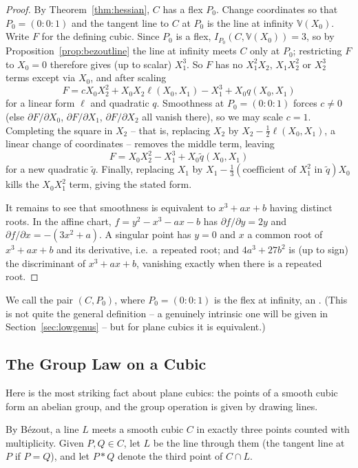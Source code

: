 \documentclass[a4paper]{scrartcl}
\newcommand{\V}{\mathbb{V}}
\begin{document}
\begin{proof}
	By Theorem~\ref{thm:hessian}, $C$ has a flex $P_0$. Change coordinates so that $P_0 = (0:0:1)$ and the tangent line to $C$ at $P_0$ is the line at infinity $\V(X_0)$. Write $F$ for the defining cubic. Since $P_0$ is a flex, $I_{P_0}(C,\V(X_0)) = 3$, so by Proposition~\ref{prop:bezoutline} the line at infinity meets $C$ only at $P_0$; restricting $F$ to $X_0 = 0$ therefore gives (up to scalar) $X_1^3$. So $F$ has no $X_1^2X_2$, $X_1X_2^2$ or $X_2^3$ terms except via $X_0$, and after scaling
	$$F = cX_0X_2^2 + X_0 X_2 \ell(X_0,X_1) - X_1^3 + X_0 q(X_0,X_1)$$
	for a linear form $\ell$ and quadratic $q$. Smoothness at $P_0 = (0:0:1)$ forces $c \neq 0$ (else $\partial F/\partial X_0$, $\partial F/\partial X_1$, $\partial F/\partial X_2$ all vanish there), so we may scale $c = 1$. Completing the square in $X_2$ -- that is, replacing $X_2$ by $X_2 - \tfrac12 \ell(X_0,X_1)$, a linear change of coordinates -- removes the middle term, leaving
	$$F = X_0X_2^2 - X_1^3 + X_0\tilde q(X_0,X_1)$$
	for a new quadratic $\tilde q$. Finally, replacing $X_1$ by $X_1 - \tfrac13(\text{coefficient of } X_1^2 \text{ in } \tilde q)X_0$ kills the $X_0X_1^2$ term, giving the stated form.

	It remains to see that smoothness is equivalent to $x^3+ax+b$ having distinct roots. In the affine chart, $f = y^2 - x^3-ax-b$ has $\partial f/\partial y = 2y$ and $\partial f/\partial x = -(3x^2+a)$. A singular point has $y = 0$ and $x$ a common root of $x^3+ax+b$ and its derivative, i.e.\ a repeated root; and $4a^3+27b^2$ is (up to sign) the discriminant of $x^3+ax+b$, vanishing exactly when there is a repeated root.
\end{proof}

We call the pair $(C,P_0)$, where $P_0 = (0:0:1)$ is the flex at infinity, an . (This is not quite the general definition -- a genuinely intrinsic one will be given in Section~\ref{sec:lowgenus} -- but for plane cubics it is equivalent.)

\subsection{The Group Law on a Cubic}

Here is the most striking fact about plane cubics: the points of a smooth cubic form an abelian group, and the group operation is given by drawing lines.

By B\'ezout, a line $L$ meets a smooth cubic $C$ in exactly three points counted with multiplicity. Given $P,Q \in C$, let $L$ be the line through them (the tangent line at $P$ if $P = Q$), and let $P * Q$ denote the third point of $C \cap L$.
\end{document}
